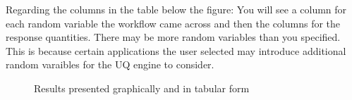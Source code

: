 Regarding the columns in the table below the figure: You will see a column for each random variable the workflow came across and then the columns for the response quantities. There may be more random variables than you specified. This is because certain applications the user selected may introduce additional random varaibles for the UQ engine to consider. 

\begin{figure}[!htbp]
  \caption{Results presented graphically and in tabular form}
  \label{fig:results_data}
\end{figure}
